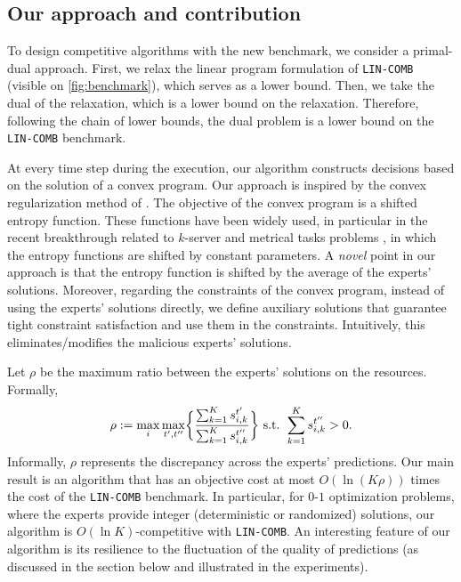 \subsection{Our approach and contribution}

To design competitive algorithms with the new benchmark, we consider a primal-dual approach. First, we relax the linear program formulation of \texttt{LIN-COMB} (visible on \cref{fig:benchmark}), which serves as a lower bound. Then, we take the dual of the relaxation, which is a lower bound on the relaxation. Therefore, following the chain of lower bounds, the dual problem is a lower bound on the \texttt{LIN-COMB} benchmark.

At every time step during the execution, our algorithm constructs decisions based on the solution of a convex program. Our approach is inspired by the
convex regularization method of \cite{BuchbinderChen14:Competitive-Analysis}. The objective of the convex program is a shifted entropy function.
These functions have been widely used, in particular in the recent breakthrough related to $k$-server \cite{BubeckCohen18:K-server-via-multiscale,BuchbinderGupta19:k-servers-with}
and metrical tasks problems \cite{BubeckCohen21:Metrical-task},
in which the entropy functions are shifted by constant parameters.
A \emph{novel} point in our approach is that the entropy function is shifted by the average of the experts' solutions.
Moreover, regarding the constraints of the convex program, instead of using the experts' solutions directly,
we define auxiliary solutions that guarantee tight constraint satisfaction and use them in the constraints.
Intuitively, this eliminates/modifies the malicious experts' solutions.

Let $\rho$ be the maximum ratio between the experts' solutions on the resources. Formally,
\[
	\rho := \max_{i} \max_{t',t''} \biggl\{\frac{\sum_{k=1}^{K} s_{i,k}^{t'}}{\sum_{k=1}^{K} s_{i,k}^{t''}} \biggr\}  \textnormal{ s.t. } \sum_{k=1}^{K} s_{i,k}^{t''} > 0.
\]
Informally, $\rho$ represents the discrepancy across the experts' predictions.
Our main result is an algorithm that has an objective cost at most $O(\ln(K\rho))$ times the cost of the \texttt{LIN-COMB} benchmark.
In particular, for $0$-$1$ optimization problems, where the experts provide integer (deterministic or randomized) solutions, our algorithm is $O(\ln K)$-competitive with \texttt{LIN-COMB}.
An interesting feature of our algorithm is its resilience to the fluctuation of the quality of predictions (as discussed in the section below and illustrated in the experiments).

